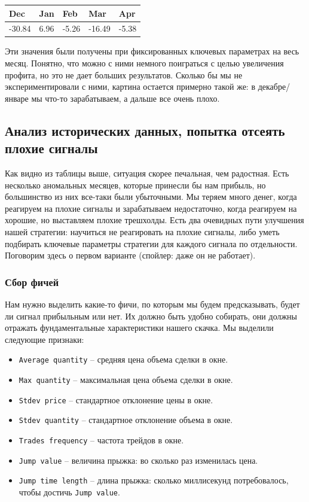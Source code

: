 \begin{table}[h]
    \centering
    \begin{tabular}[t]{ | l | l | l | l | l | }
    \hline
    Dec & Jan & Feb & Mar & Apr \\ \hline
    -30.84 & 6.96 & -5.26 & -16.49 & -5.38 \\
    \hline
    \end{tabular}
    \label{table:satellites}
\end{table}

Эти значения были получены при фиксированных ключевых параметрах на весь месяц. Понятно, что можно с ними немного поиграться с целью увеличения профита, но это не дает больших результатов. Сколько бы мы не экспериментировали с ними, картина остается примерно такой же: в декабре/январе мы что-то зарабатываем, а дальше все очень плохо.







\subsection{Анализ исторических данных, попытка отсеять плохие сигналы}
Как видно из таблицы выше, ситуация скорее печальная, чем радостная. Есть несколько аномальных месяцев, которые принесли бы нам прибыль, но большинство из них все-таки были убыточными. Мы теряем много денег, когда реагируем на плохие сигналы и зарабатываем недостаточно, когда реагируем на хорошие, но выставляем плохие трешхолды. Есть два очевидных пути улучшения нашей стратегии: научиться не реагировать на плохие сигналы, либо уметь подбирать ключевые параметры стратегии для каждого сигнала по отдельности. Поговорим здесь о первом варианте (спойлер: даже он не работает).

\subsubsection{Сбор фичей}
Нам нужно выделить какие-то фичи, по которым мы будем предсказывать, будет ли сигнал прибыльным или нет. Их должно быть удобно собирать, они должны отражать фундаментальные характеристики нашего скачка. Мы выделили следующие признаки:

\begin{itemize}
\item \texttt{Average quantity} -- средняя цена объема сделки в окне.
\item \texttt{Max quantity} -- максимальная цена объема сделки в окне.
\item \texttt{Stdev price} -- стандартное отклонение цены в окне.
\item \texttt{Stdev quantity} -- стандартное отклонение объема в окне.
\item \texttt{Trades frequency} -- частота трейдов в окне.
\item \texttt{Jump value} -- величина прыжка: во сколько раз изменилась цена.
\item \texttt{Jump time length} -- длина прыжка: сколько миллисекунд потребовалось, чтобы достичь \texttt{Jump value}.
\end{itemize}

